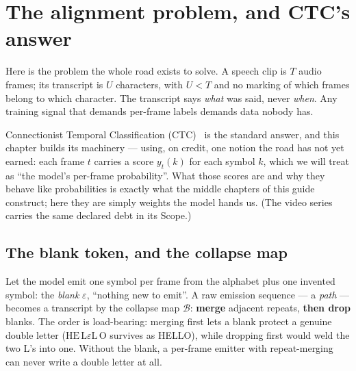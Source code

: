 \chapter{The alignment problem, and CTC's answer}

\begin{narrative}
Here is the problem the whole road exists to solve. A speech clip is
$T$ audio frames; its transcript is $U$ characters, with $U < T$ and no
marking of which frames belong to which character. The transcript says
\emph{what} was said, never \emph{when}. Any training signal that demands
per-frame labels demands data nobody has.

Connectionist Temporal Classification
(CTC)~\cite{deep_learning-graves-et-al-2006-connectionist-temporal-classification}
is the standard answer, and
this chapter builds its machinery — using, on credit, one notion the road
has not yet earned: each frame $t$ carries a score $y_t(k)$ for each
symbol $k$, which we will treat as ``the model's per-frame probability''.
What those scores are and why they behave like probabilities is exactly
what the middle chapters of this guide construct; here they are simply
weights the model hands us. (The video series carries the same declared
debt in its Scope.)

\section{The blank token, and the collapse map}

Let the model emit one symbol per frame from the alphabet plus one
invented symbol: the \emph{blank} $\varepsilon$, ``nothing new to emit''.
A raw emission sequence — a \emph{path} — becomes a transcript by the
collapse map $\mathcal{B}$: \textbf{merge} adjacent repeats, \textbf{then
drop} blanks. The order is load-bearing: merging first lets a blank
protect a genuine double letter ($\mathrm{HE}\,\mathrm{L}\varepsilon
\mathrm{L}\,\mathrm{O}$ survives as HELLO), while dropping first would
weld the two L's into one. Without the blank, a per-frame emitter with
repeat-merging can never write a double letter at all.


\end{narrative}
